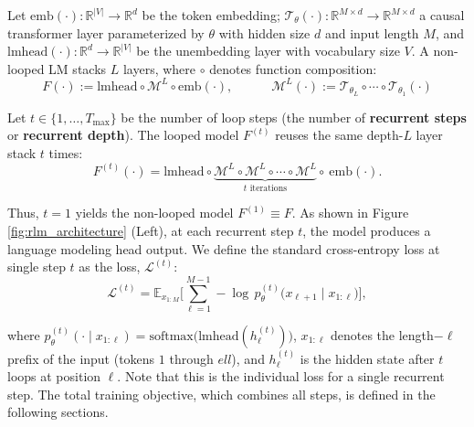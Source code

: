 \documentclass[]{bytedance_seed}
\newcommand{\1}{\mathbf{1}}
\begin{document}

Let $\mathrm{emb}(\cdot):\mathbb{R}^{|V|}\to\mathbb{R}^d$ be the token embedding; $\mathcal{T}_{\theta}(\cdot): \mathbb{R}^{M\times d}\to\mathbb{R}^{M\times d}$ a causal transformer layer parameterized by $\theta$ with hidden size $d$ and input length $M$, and $\mathrm{lmhead}(\cdot):\mathbb{R}^{d} \to \mathbb{R}^{|V|}$ be the unembedding layer with vocabulary size $V$. A non-looped LM stacks $L$ layers, where $\circ$ denotes function composition:
$$
F(\cdot) := \mathrm{lmhead}\circ\mathcal{M}^L\circ\mathrm{emb(\cdot)},\quad \qquad \mathcal{M}^L(\cdot) := \mathcal{T}_{\theta_L}\circ \cdots \circ \mathcal{T}_{\theta_1}(\cdot)
$$

Let $t \in \{1, \dots, T_{\max}\}$ be the number of loop steps (the number of \textbf{recurrent steps} or \textbf{recurrent depth}). The looped model $F^{(t)}$ reuses the same depth-$L$ layer stack $t$ times:
\begin{equation}\label{eqdef:looped-lm}
F^{(t)}(\cdot) = \mathrm{lmhead}\circ\underbrace{\mathcal{M}^L\circ \mathcal{M}^L\circ\cdots\circ \mathcal{M}^L}_{t \text{ iterations}}\circ\ \mathrm{emb}(\cdot).
\end{equation}

Thus, $t=1$ yields the non-looped model $F^{(1)} \equiv F$.
As shown in Figure \ref{fig:rlm_architecture} (Left), at each recurrent step $t$, the model produces a language modeling head output. We define the standard cross-entropy loss at single step $t$ as the loss, $\mathcal{L}^{(t)}$:
\begin{equation}\label{eqdef:loop-loss}
\mathcal{L}^{(t)}
= \mathbb{E}_{x_{1:M}}\Bigg[ \sum_{\ell=1}^{M-1}
-\log\, p^{(t)}_\theta\!\big(x_{\ell+1}\mid x_{1:\ell}\big) \Bigg],
\end{equation}

where $p^{(t)}_\theta(\cdot\mid x_{1:\ell})=\mathrm{softmax}\!\big(\mathrm{lmhead}(h^{(t)}_\ell)\big)$, $x_{1:\ell}$ denotes the length$-\ell$ prefix of the input (tokens $1$ through $ell$), and $h^{(t)}_\ell$ is the hidden state after $t$ loops at position $\ell$. Note that this is the individual loss for a single recurrent step. The total training objective, which combines all steps, is defined in the following sections.
\end{document}
